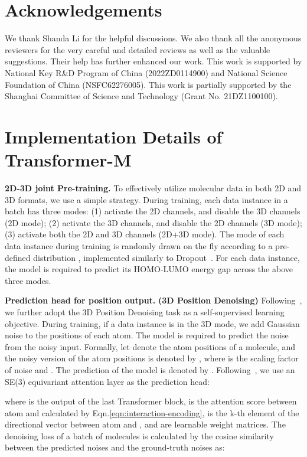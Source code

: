 \documentclass{article} \usepackage[dvipsnames]{xcolor}
\begin{document}
\section*{Acknowledgements}
We thank Shanda Li for the helpful discussions. We also thank all the anonymous reviewers for the very careful and detailed reviews as well as the valuable suggestions. Their help has further enhanced our work. This work is supported by National Key R\&D Program of China (2022ZD0114900) and National Science Foundation of China (NSFC62276005). This work is partially supported by the Shanghai Committee of Science and Technology (Grant No. 21DZ1100100).




\newpage
\appendix
\section{Implementation Details of Transformer-M}
\vspace{-4pt}
\textbf{2D-3D joint Pre-training.} 
To effectively utilize molecular data in both 2D and 3D formats, we use a simple strategy. During training, each data instance in a batch has three modes: (1) activate the 2D channels, and disable the 3D channels (2D mode); (2) activate the 3D channels, and disable the 2D channels (3D mode); (3) activate both the 2D and 3D channels (2D+3D mode). The mode of each data instance during training is randomly drawn on the fly according to a pre-defined distribution , implemented similarly to Dropout~\citep{srivastava2014dropout}. For each data instance, the model is required to predict its HOMO-LUMO energy gap across the above three modes.

\textbf{Prediction head for position output.} \textbf{(3D Position Denoising)}
Following~\cite{godwin2022simple,zaidi2022pre}, we further adopt the 3D Position Denoising task as a self-supervised learning objective. During training, if a data instance is in the 3D mode, we add Gaussian noise to the positions of each atom. The model is required to predict the noise from the noisy input. Formally, let  denote the atom positions of a molecule, and the noisy version of the atom positions is denoted by , where  is the scaling factor of noise and . The prediction of the model is denoted by . Following~\cite{shi2022benchmarking}, we use an SE(3) equivariant attention layer as the prediction head:



where  is the output of the last Transformer block,  is the attention score between atom  and  calculated by Eqn.\ref{eqn:interaction-encoding},  is the k-th element of the directional vector  between atom  and , and  are learnable weight matrices. The denoising loss of a batch of molecules  is calculated by the cosine similarity between the predicted noises and the ground-truth noises as: 
\end{document}
